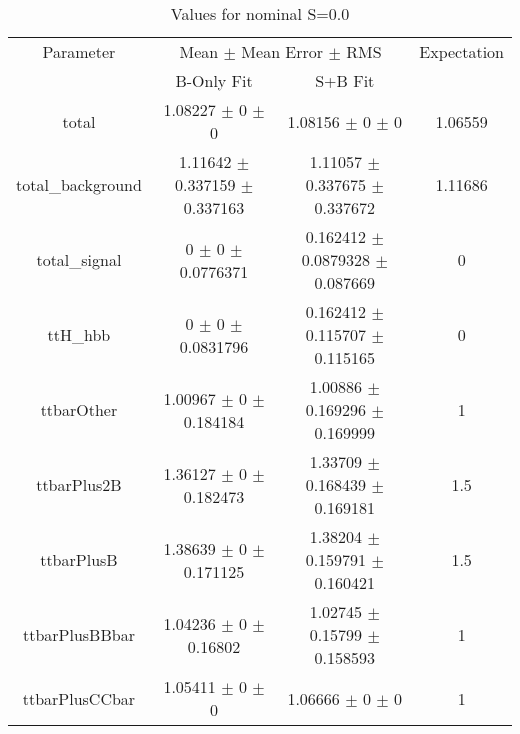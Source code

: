 \begin{table}
\centering
\caption{Values for nominal S=0.0}
\begin{tabular}{cccc}
\toprule
Parameter & \multicolumn{2}{c}{Mean $\pm$ Mean Error $\pm$ RMS} & Expectation\\
 & B-Only Fit & S+B Fit & \\
\midrule
total & \num{1.08227} $\pm$ \num{0} $\pm$ \num{0} & \num{1.08156} $\pm$ \num{0} $\pm$ \num{0} & \num{1.06559}\\
total\_background & \num{1.11642} $\pm$ \num{0.337159} $\pm$ \num{0.337163} & \num{1.11057} $\pm$ \num{0.337675} $\pm$ \num{0.337672} & \num{1.11686}\\
total\_signal & \num{0} $\pm$ \num{0} $\pm$ \num{0.0776371} & \num{0.162412} $\pm$ \num{0.0879328} $\pm$ \num{0.087669} & \num{0}\\
ttH\_hbb & \num{0} $\pm$ \num{0} $\pm$ \num{0.0831796} & \num{0.162412} $\pm$ \num{0.115707} $\pm$ \num{0.115165} & \num{0}\\
ttbarOther & \num{1.00967} $\pm$ \num{0} $\pm$ \num{0.184184} & \num{1.00886} $\pm$ \num{0.169296} $\pm$ \num{0.169999} & \num{1}\\
ttbarPlus2B & \num{1.36127} $\pm$ \num{0} $\pm$ \num{0.182473} & \num{1.33709} $\pm$ \num{0.168439} $\pm$ \num{0.169181} & \num{1.5}\\
ttbarPlusB & \num{1.38639} $\pm$ \num{0} $\pm$ \num{0.171125} & \num{1.38204} $\pm$ \num{0.159791} $\pm$ \num{0.160421} & \num{1.5}\\
ttbarPlusBBbar & \num{1.04236} $\pm$ \num{0} $\pm$ \num{0.16802} & \num{1.02745} $\pm$ \num{0.15799} $\pm$ \num{0.158593} & \num{1}\\
ttbarPlusCCbar & \num{1.05411} $\pm$ \num{0} $\pm$ \num{0} & \num{1.06666} $\pm$ \num{0} $\pm$ \num{0} & \num{1}\\
\bottomrule
\end{tabular}
\end{table}